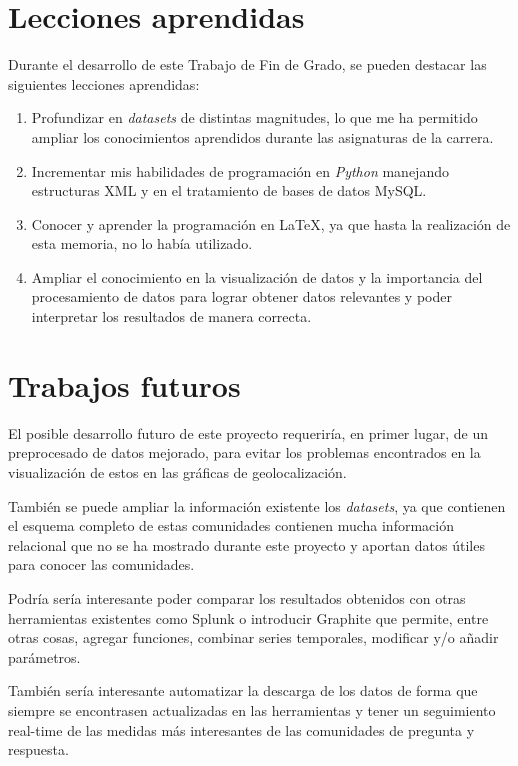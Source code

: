 \documentclass[a4paper, 12pt]{book}
\begin{document}
\section{Lecciones aprendidas}
\label{sec:lecciones_aprendidas}

Durante el desarrollo de este Trabajo de Fin de Grado, se pueden destacar las siguientes lecciones aprendidas:

\begin{enumerate}
  \item Profundizar en \textit{datasets} de distintas magnitudes, lo que me ha permitido ampliar los conocimientos aprendidos durante las asignaturas de la carrera.
  \item Incrementar mis habilidades de programación en \emph{Python} manejando estructuras XML y en el tratamiento de bases de datos MySQL.
  \item Conocer y aprender la programación en \LaTeX, ya que hasta la realización de esta memoria, no lo había utilizado.
  \item Ampliar el conocimiento en la visualización de datos y la importancia del procesamiento de datos para lograr obtener datos relevantes y poder interpretar los resultados de manera correcta. 
\end{enumerate}


\section{Trabajos futuros}
\label{sec:trabajos_futuros}
El posible desarrollo futuro de este proyecto requeriría, en primer lugar, de un preprocesado de datos mejorado, para evitar los problemas encontrados en la visualización de estos en las gráficas de geolocalización. 

También se puede ampliar la información existente los \textit{datasets}, ya que contienen el esquema completo de estas comunidades contienen mucha información relacional que no se ha mostrado durante este proyecto y aportan datos útiles para conocer las comunidades.

Podría sería interesante poder comparar los resultados obtenidos con otras herramientas existentes como Splunk o introducir Graphite que permite, entre otras cosas, agregar funciones, combinar series temporales, modificar y/o añadir parámetros.

También sería interesante automatizar la descarga de los datos de forma que siempre se encontrasen actualizadas en las herramientas y tener un seguimiento real-time de las medidas más interesantes de las comunidades de pregunta y respuesta.
\clearpage
\glsaddall
\printglossary[type=\acronymtype]
\printglossary
\end{document}
